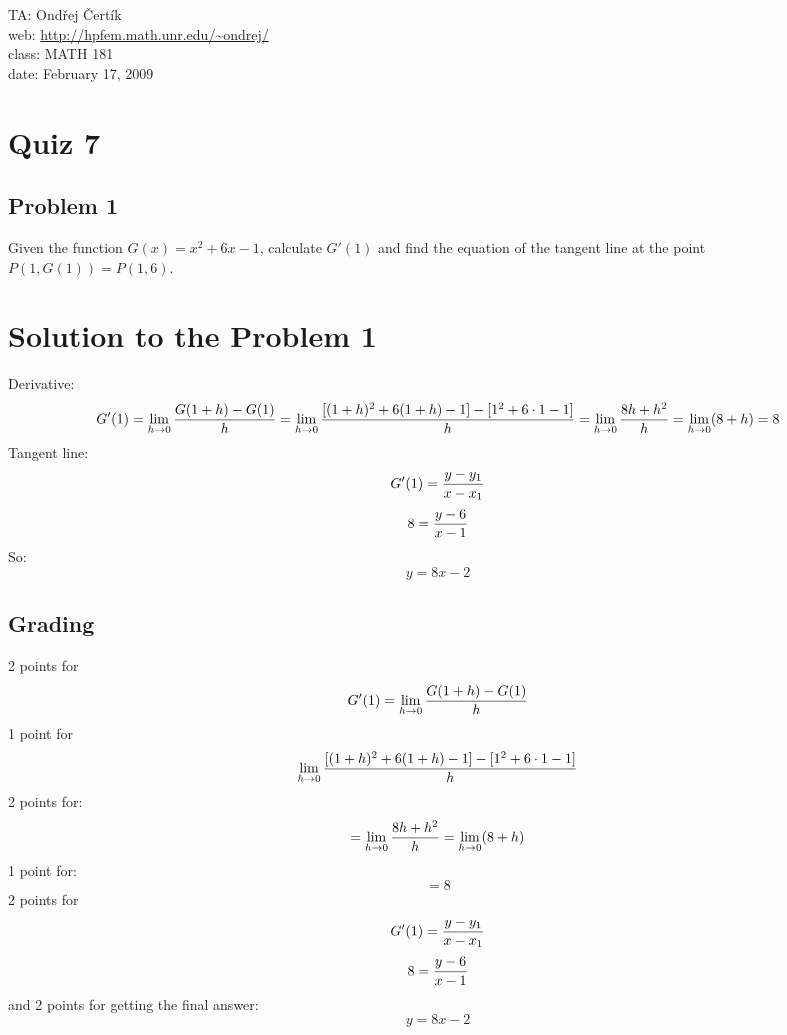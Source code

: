 \documentclass[10pt]{article}
\begin{document}
\noindent TA: Ondřej Čertík\\
web: \url{http://hpfem.math.unr.edu/~ondrej/}\\
class: MATH 181\\
date: February 17, 2009

\section*{Quiz 7}

\subsection*{Problem 1}

Given the function $G(x)=x^2+6x-1$, calculate $G'(1)$ and find the equation of
the tangent line at the point $P(1, G(1)) = P(1, 6)$.

\section*{Solution to the Problem 1}

Derivative:
$$G'(1)
=\lim_{h\to0}{G(1+h)-G(1)\over h}
=\lim_{h\to0}{[(1+h)^2+6(1+h)-1]-[1^2+6\cdot1-1]\over h}
=\lim_{h\to0}{8h+h^2\over h}
=\lim_{h\to0}(8+h)
=8$$
Tangent line:
$$G'(1) = {y-y_1\over x-x_1}$$
$$8 = {y-6\over x-1}$$
So:
$$y=8x-2$$

\subsection*{Grading}

2 points for
$$G'(1)
=\lim_{h\to0}{G(1+h)-G(1)\over h}
$$
1 point for
$$
\lim_{h\to0}{[(1+h)^2+6(1+h)-1]-[1^2+6\cdot1-1]\over h}
$$
2 points for:
$$
=\lim_{h\to0}{8h+h^2\over h}
=\lim_{h\to0}(8+h)
$$
1 point for:
$$=8$$
2 points for
$$G'(1) = {y-y_1\over x-x_1}$$
$$8 = {y-6\over x-1}$$
and 2 points for getting the final answer:
$$y=8x-2$$
\end{document}
